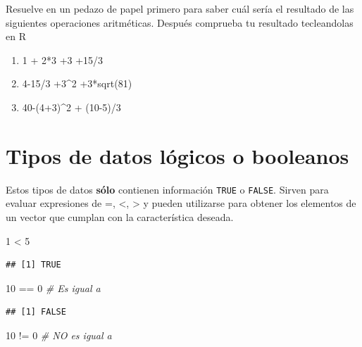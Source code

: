 \documentclass[
]{book}
\newenvironment{Shaded}{\begin{snugshade}}{\end{snugshade}}
\newcommand{\CommentTok}[1]{\textcolor[rgb]{0.56,0.35,0.01}{\textit{#1}}}
\newcommand{\DecValTok}[1]{\textcolor[rgb]{0.00,0.00,0.81}{#1}}
\newcommand{\SpecialCharTok}[1]{\textcolor[rgb]{0.00,0.00,0.00}{#1}}
\providecommand{\tightlist}{%
  \setlength{\itemsep}{0pt}\setlength{\parskip}{0pt}}
\begin{document}
Resuelve en un pedazo de papel primero para saber cuál sería el resultado de las siguientes operaciones aritméticas. Después comprueba tu resultado tecleandolas en R

\begin{enumerate}
\def\labelenumi{\arabic{enumi}.}
\tightlist
\item
  1 + 2*3 +3 +15/3
\item
  4-15/3 +3\^{}2 +3*sqrt(81)
\item
  40-(4+3)\^{}2 + (10-5)/3
\end{enumerate}

\hypertarget{tipos-de-datos-luxf3gicos-o-booleanos}{%
\section{Tipos de datos lógicos o booleanos}\label{tipos-de-datos-luxf3gicos-o-booleanos}}

Estos tipos de datos \textbf{sólo} contienen información \texttt{TRUE} o \texttt{FALSE}. Sirven para evaluar expresiones de =, \textless, \textgreater{} y pueden utilizarse para obtener los elementos de un vector que cumplan con la característica deseada.

\begin{Shaded}
\begin{Highlighting}[]
\DecValTok{1} \SpecialCharTok{\textless{}} \DecValTok{5}
\end{Highlighting}
\end{Shaded}

\begin{verbatim}
## [1] TRUE
\end{verbatim}

\begin{Shaded}
\begin{Highlighting}[]
\DecValTok{10} \SpecialCharTok{==} \DecValTok{0}  \CommentTok{\# Es igual a}
\end{Highlighting}
\end{Shaded}

\begin{verbatim}
## [1] FALSE
\end{verbatim}

\begin{Shaded}
\begin{Highlighting}[]
\DecValTok{10} \SpecialCharTok{!=} \DecValTok{0}    \CommentTok{\# NO es igual a}
\end{Highlighting}
\end{Shaded}
\end{document}
